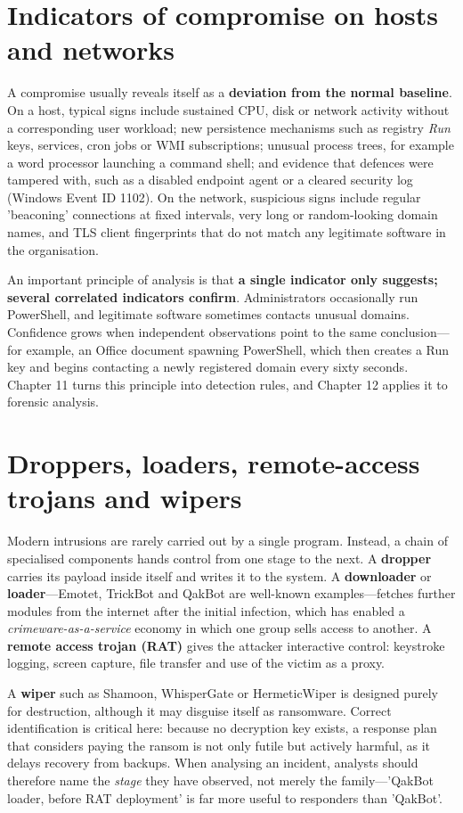 \documentclass[11pt,openany]{book}
\begin{document}
\section{Indicators of compromise on hosts and networks}\label{sec:4.3}
A compromise usually reveals itself as a \textbf{deviation from the normal baseline}. On a host, typical signs include sustained CPU, disk or network activity without a corresponding user workload; new persistence mechanisms such as registry \emph{Run} keys, services, cron jobs or WMI subscriptions; unusual process trees, for example a word processor launching a command shell; and evidence that defences were tampered with, such as a disabled endpoint agent or a cleared security log (Windows Event ID 1102). On the network, suspicious signs include regular 'beaconing' connections at fixed intervals, very long or random-looking domain names, and TLS client fingerprints that do not match any legitimate software in the organisation.

An important principle of analysis is that \textbf{a single indicator only suggests; several correlated indicators confirm}. Administrators occasionally run PowerShell, and legitimate software sometimes contacts unusual domains. Confidence grows when independent observations point to the same conclusion—for example, an Office document spawning PowerShell, which then creates a Run key and begins contacting a newly registered domain every sixty seconds. Chapter 11 turns this principle into detection rules, and Chapter 12 applies it to forensic analysis.

\section{Droppers, loaders, remote-access trojans and wipers}\label{sec:4.4}
Modern intrusions are rarely carried out by a single program. Instead, a chain of specialised components hands control from one stage to the next. A \textbf{dropper} carries its payload inside itself and writes it to the system. A \textbf{downloader} or \textbf{loader}—Emotet, TrickBot and QakBot are well-known examples—fetches further modules from the internet after the initial infection, which has enabled a \emph{crimeware-as-a-service} economy in which one group sells access to another. A \textbf{remote access trojan (RAT)} gives the attacker interactive control: keystroke logging, screen capture, file transfer and use of the victim as a proxy.

A \textbf{wiper} such as Shamoon, WhisperGate or HermeticWiper is designed purely for destruction, although it may disguise itself as ransomware. Correct identification is critical here: because no decryption key exists, a response plan that considers paying the ransom is not only futile but actively harmful, as it delays recovery from backups. When analysing an incident, analysts should therefore name the \emph{stage} they have observed, not merely the family—'QakBot loader, before RAT deployment' is far more useful to responders than 'QakBot'.
\end{document}
